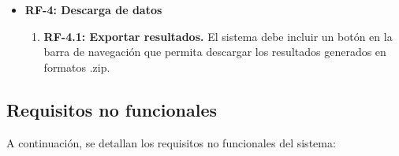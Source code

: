 \begin{itemize}
    \item \textbf{RF-4: Descarga de datos}
    \begin{enumerate}
        \item \textbf{RF-4.1: Exportar resultados.}  
        El sistema debe incluir un botón en la barra de navegación que permita descargar los resultados generados en formatos .zip.
    \end{enumerate}

\end{itemize}

\subsection{Requisitos no funcionales}

A continuación, se detallan los requisitos no funcionales del sistema:

